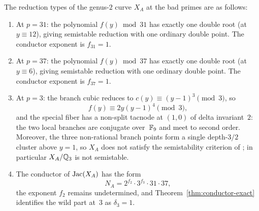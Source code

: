 \begin{theorem}\label{thm:reduction-types}
The reduction types of the genus-\(2\) curve \(X_A\) at the bad primes are as follows:
\begin{enumerate}
\item[(i)] At \(p=31\): the polynomial \(f(y)\bmod 31\) has exactly one double root (at \(y\equiv 12\)), giving semistable reduction with one ordinary double point. The conductor exponent is \(f_{31}=1\).
\item[(ii)] At \(p=37\): the polynomial \(f(y)\bmod 37\) has exactly one double root (at \(y\equiv 6\)), giving semistable reduction with one ordinary double point. The conductor exponent is \(f_{37}=1\).
\item[(iii)] At \(p=3\): the branch cubic reduces to \(c(y)\equiv (y-1)^3\pmod{3}\), so
\[
f(y)\equiv 2y(y-1)^4\pmod{3},
\]
and the special fiber has a non-split tacnode at \((1,0)\) of delta invariant~\(2\): the two local branches are conjugate over~\(\mathbb{F}_9\) and meet to second order. Moreover, the three non-rational branch points form a single depth-\(3/2\) cluster above \(y=1\), so \(X_A\) does not satisfy the semistability criterion of \cite[Definition~1.8 and Theorem~1.9]{DDMM2023}; in particular \(X_A/\mathbb{Q}_3\) is not semistable.
\item[(iv)] The conductor of \(\operatorname{Jac}(X_A)\) has the form
\[
N_A=2^{f_2}\cdot 3^{f_3}\cdot 31\cdot 37,
\]
the exponent \(f_2\) remains undetermined, and Theorem~\ref{thm:conductor-exact} identifies the wild part at~\(3\) as \(\delta_3=1\).
\end{enumerate}
\end{theorem}

